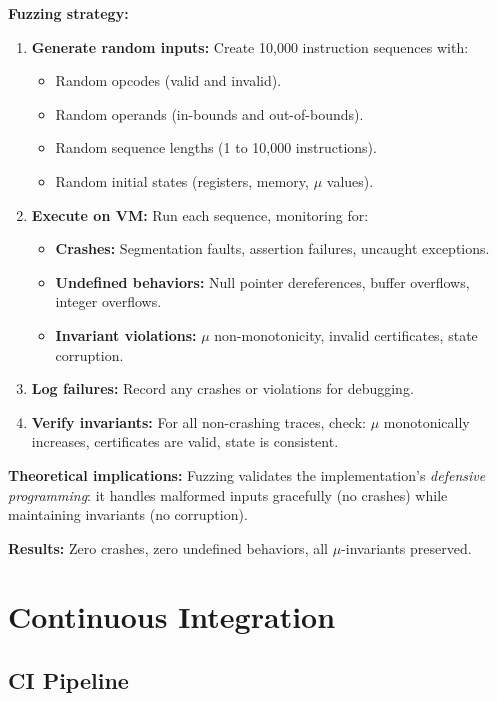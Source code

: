 \textbf{Fuzzing strategy:}
\begin{enumerate}
    \item \textbf{Generate random inputs:} Create 10,000 instruction sequences with:
    \begin{itemize}
        \item Random opcodes (valid and invalid).
        \item Random operands (in-bounds and out-of-bounds).
        \item Random sequence lengths (1 to 10,000 instructions).
        \item Random initial states (registers, memory, $\mu$ values).
    \end{itemize}
    
    \item \textbf{Execute on VM:} Run each sequence, monitoring for:
    \begin{itemize}
        \item \textbf{Crashes:} Segmentation faults, assertion failures, uncaught exceptions.
        \item \textbf{Undefined behaviors:} Null pointer dereferences, buffer overflows, integer overflows.
        \item \textbf{Invariant violations:} $\mu$ non-monotonicity, invalid certificates, state corruption.
    \end{itemize}
    
    \item \textbf{Log failures:} Record any crashes or violations for debugging.
    
    \item \textbf{Verify invariants:} For all non-crashing traces, check: $\mu$ monotonically increases, certificates are valid, state is consistent.
\end{enumerate}

\textbf{Theoretical implications:} Fuzzing validates the implementation's \textit{defensive programming}: it handles malformed inputs gracefully (no crashes) while maintaining invariants (no corruption).


\textbf{Results:} Zero crashes, zero undefined behaviors, all $\mu$-invariants preserved.

\section{Continuous Integration}


\subsection{CI Pipeline}

